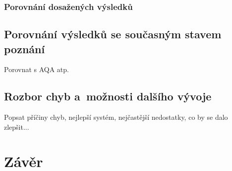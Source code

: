 \subsection{Porovnání dosažených výsledků}

\section{Porovnání výsledků se současným stavem poznání}
Porovnat  s AQA atp. \cite{aqa}


\section{Rozbor chyb a~možnosti dalšího vývoje}
Popsat příčiny chyb, nejlepší systém, nejčastější nedostatky, co by se dalo zlepšit...



\chapter{Závěr}
\label{conclusion}


